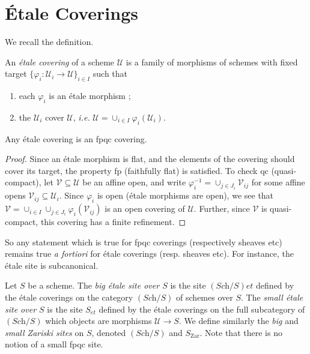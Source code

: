 \section{\'Etale Coverings}
\label{section-etale-covering}

\noindent
We recall the definition.

\begin{definition}
\label{definition-etale-covering}
An {\it \'etale covering} of a scheme $\mathcal{U}$ is a family of morphisms
of schemes with fixed target $\{ \varphi_i : \mathcal{U}_i \to \mathcal{U}
\}_{i \in I}$ such that
\begin{enumerate}
\item each $\varphi_i$ is an \'etale morphism ;
\item the $\mathcal{U}_i$ cover $\mathcal{U}$, {\it i.e.} $\mathcal{U} =
\cup_{i\in I}\varphi_i(\mathcal{U}_i)$.
\end{enumerate}
\end{definition}

\begin{lemma}
\label{lemma-etale-fpqc}
Any \'etale covering is an fpqc covering.
\end{lemma}

\begin{proof}
Since an \'etale morphism is flat, and the elements of the covering should
cover its target, the property fp (faithfully flat) is satisfied. To check qc
(quasi-compact), let $\mathcal{V} \subseteq \mathcal{U}$ be an affine open, and
write $\varphi_i^{-1} = \cup_{j \in J_i} \mathcal{V}_{ij}$ for some affine
opens $\mathcal{V}_{ij} \subseteq \mathcal{U}_i$. Since $\varphi_i$ is open
(\'etale morphisms are open), we see that $\mathcal{V} = \cup_{i\in I}\cup_{j
\in J_i} \varphi_i(\mathcal{V}_{ij})$ is an open covering of $\mathcal{U}$.
Further, since $\mathcal{V}$ is quasi-compact, this covering has a finite
refinement.
\end{proof}

\noindent
So any statement which is true for fpqc coverings (respectively sheaves etc)
remains true {\it a fortiori} for \'etale coverings (resp. sheaves etc). For
instance, the \'etale site is subcanonical.

\begin{definition}
\label{definition-big-etale-site}
Let $S$ be a scheme. The {\it big \'etale site over $S$} is the site
$(\textit{Sch}/S)et$ defined by the \'etale coverings on the category
$(\textit{Sch}/S)$ of schemes over $S$. The
{\it small \'etale site over $S$} is
the site $S_{et}$ defined by the \'etale coverings on the full subcategory of
$(\textit{Sch}/S)$ which objects are morphisms $\mathcal{U} \to S$. We define
similarly the {\it big} and {\it small Zariski sites} on $S$, denoted
$(\textit{Sch}/S)$ and $S_\mathrm{Zar}$. Note that there is no notion
of a small fpqc site.
\end{definition}

